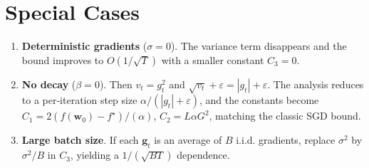 \documentclass{article}
\begin{document}
\section*{Special Cases}
\begin{enumerate}[label=\textbf{S\arabic*:}, leftmargin=*]
\item \textbf{Deterministic gradients} ($\sigma=0$). The variance term disappears and the bound improves to $O(1/\sqrt{T})$ with a smaller constant $C_{3}=0$.
\item \textbf{No decay} ($\beta=0$). Then $v_{t}=g_{t}^{2}$ and $\sqrt{v_{t}}+\varepsilon = |g_{t}|+\varepsilon$. The analysis reduces to a per‑iteration step size $\alpha/(|g_{t}|+\varepsilon)$, and the constants become $C_{1}=2(f(\bm w_{0})-f^{\star})/(\alpha)$, $C_{2}=L\alpha G^{2}$, matching the classic SGD bound.
\item \textbf{Large batch size}. If each $\bm g_{t}$ is an average of $B$ i.i.d. gradients, replace $\sigma^{2}$ by $\sigma^{2}/B$ in $C_{3}$, yielding a $1/(\sqrt{BT})$ dependence.
\end{enumerate}
\end{document}
